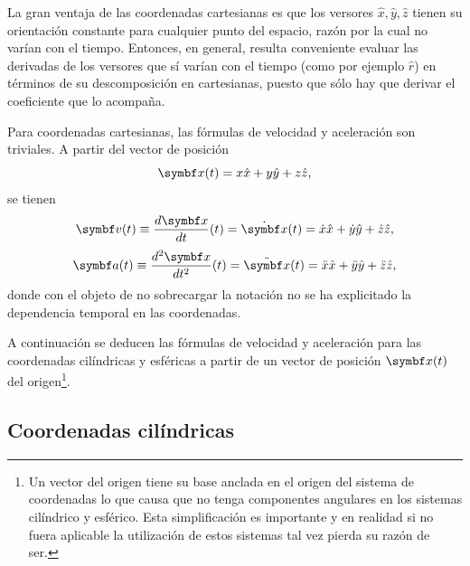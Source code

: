 \documentclass[10pt,oneside]{CBFT_book}
\begin{document}
La gran ventaja de las coordenadas cartesianas es que los versores $ \hat{ x }, \hat{ y }, \hat{ z }$ tienen su orientación
constante para cualquier punto del espacio, razón por la cual no varían con el tiempo. Entonces, en general, resulta 
conveniente evaluar las derivadas de los versores que sí varían con el tiempo (como por ejemplo $\hat{r}$) en términos de
su descomposición en cartesianas, puesto que sólo hay que derivar el coeficiente que lo acompaña.

Para coordenadas cartesianas, las fórmulas de velocidad y aceleración son triviales. A partir del vector de posición
\[
	\vb{x}(t) = x \hat{x} + y \hat{y}  + z\hat{z},
\]
se tienen 
\[
	\vb{v}(t) \equiv \dtot{\vb{x}}{t}(t) = \dot{\vb{x}}(t) = \dot{x} \hat{x} + \dot{y} \hat{y}  + \dot{z}\hat{z},
\]
\[
	\vb{a}(t) \equiv \dtot[2]{\vb{x}}{t}(t) = \ddot{\vb{x}}(t) = \ddot{x} \hat{x} + \ddot{y} \hat{y}  + \ddot{z} \hat{z},
\]
donde con el objeto de no sobrecargar la notación no se ha explicitado la dependencia temporal en las coordenadas.

A continuación se deducen las fórmulas de velocidad y aceleración para las coordenadas cilíndricas y esféricas a partir de
un vector de posición $ \vb{x}(t) $ del origen\footnote{Un vector del origen tiene su base anclada en el origen del sistema
de coordenadas lo que causa que no tenga componentes angulares en los sistemas cilíndrico y esférico. Esta simplificación
es importante y en realidad si no fuera aplicable la utilización de estos sistemas tal vez pierda su razón de ser.}.


\subsection{Coordenadas cilíndricas}
\end{document}
